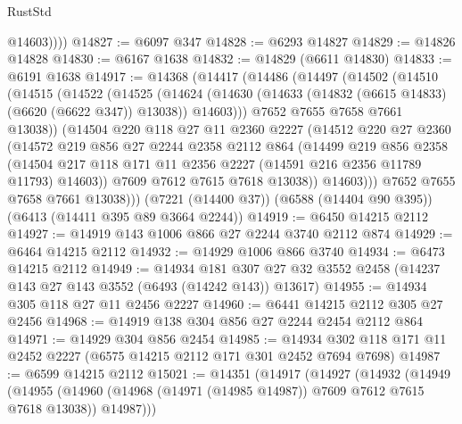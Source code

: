 \begin{lexlean}{RustStd}
\begin{coremodule}
            @14603))))
@14827 := @6097 @347
@14828 := @6293 @14827
@14829 := @14826 @14828
@14830 := @6167 @1638
@14832 := @14829 (@6611 @14830)
@14833 := @6191 @1638
@14917 := @14368
    (@14417
      (@14486
        (@14497
          (@14502
            (@14510
              (@14515
                (@14522
                  (@14525
                    (@14624
                      (@14630 (@14633 (@14832 (@6615 @14833) (@6620 (@6622 @347)) @13038)) @14603)))
                  @7652
                  @7655
                  @7658
                  @7661
                  @13038))
              (@14504
                @220
                @118
                @27
                @11
                @2360
                @2227
                (@14512
                  @220
                  @27
                  @2360
                  (@14572
                    @219
                    @856
                    @27
                    @2244
                    @2358
                    @2112
                    @864
                    (@14499
                      @219
                      @856
                      @2358
                      (@14504
                        @217
                        @118
                        @171
                        @11
                        @2356
                        @2227
                        (@14591 @216 @2356 @11789 @11793)
                        @14603))
                    @7609
                    @7612
                    @7615
                    @7618
                    @13038))
                @14603)))
          @7652
          @7655
          @7658
          @7661
          @13038)))
    (@7221 (@14400 @37))
    (@6588 (@14404 @90 @395))
    (@6413 (@14411 @395 @89 @3664 @2244))
@14919 := @6450 @14215 @2112
@14927 := @14919 @143 @1006 @866 @27 @2244 @3740 @2112 @874
@14929 := @6464 @14215 @2112
@14932 := @14929 @1006 @866 @3740
@14934 := @6473 @14215 @2112
@14949 := @14934
    @181
    @307
    @27
    @32
    @3552
    @2458
    (@14237 @143 @27 @143 @3552 (@6493 (@14242 @143)) @13617)
@14955 := @14934 @305 @118 @27 @11 @2456 @2227
@14960 := @6441 @14215 @2112 @305 @27 @2456
@14968 := @14919 @138 @304 @856 @27 @2244 @2454 @2112 @864
@14971 := @14929 @304 @856 @2454
@14985 := @14934 @302 @118 @171 @11 @2452 @2227 (@6575 @14215 @2112 @171 @301 @2452 @7694 @7698)
@14987 := @6599 @14215 @2112
@15021 := @14351
    (@14917
      (@14927
        (@14932
          (@14949
            (@14955
              (@14960 (@14968 (@14971 (@14985 @14987)) @7609 @7612 @7615 @7618 @13038))
              @14987)))

\end{coremodule}
\end{lexlean}

